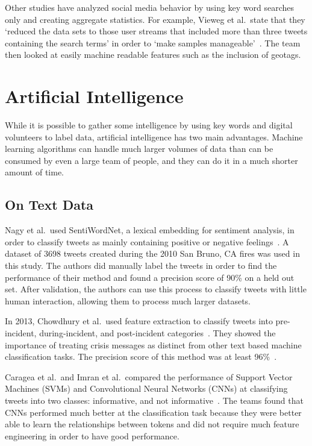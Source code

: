 Other studies have analyzed social media behavior by using key word searches only and
creating aggregate statistics. For example, Vieweg et al.\ state that they `reduced
the data sets to those user streams that included more than three tweets
containing the search terms' in order to 
`make samples manageable'~\cite{viewegMicrobloggingTwoNatural2010}. The team then looked
at easily machine readable features such as the inclusion of geotags.

\section{Artificial Intelligence}
While it is possible to gather some intelligence by using key words and
digital volunteers to label data, artificial intelligence has two main advantages. 
Machine learning algorithms can handle much larger volumes of data than can be 
consumed by even a large team of people, and they can do it in a much 
shorter amount of time.

\subsection{On Text Data}\label{chap3:text}
Nagy et al.\ used SentiWordNet, a lexical embedding for sentiment analysis, in order 
to classify tweets as mainly containing positive or negative feelings~\cite{nagyCrowdSentimentDetection2012}.
A dataset of 3698 tweets created during the 2010 San Bruno, CA fires was used in this study. 
The authors did manually label the tweets in order to find the performance of their
method and found a precision score of 90\% on a held out set. After validation,
the authors can use this process to classify tweets with little human interaction,
allowing them to process much larger datasets.

In 2013, Chowdhury et al.\ used feature extraction to classify tweets into
pre-incident, during-incident, and post-incident categories~\cite{chowdhuryTweet4actUsingIncidentspecific2013}.
They showed the importance of treating crisis messages as distinct from other
text based machine classification tasks. The precision score of this method 
was at least 96\%~\cite{chowdhuryTweet4actUsingIncidentspecific2013}.

Caragea et al.\ and Imran et al.\ compared the performance of Support Vector Machines (SVMs) and Convolutional 
Neural Networks (CNNs) at classifying tweets into two classes: informative, and not
informative~\cite{carageaIdentifyingInformativeMessages2016,imranPracticalExtractionDisasterrelevant2013}. The
teams found that CNNs performed much better at the classification task because they were better 
able to learn the relationships between tokens and did not require much feature engineering in order 
to have good performance.


